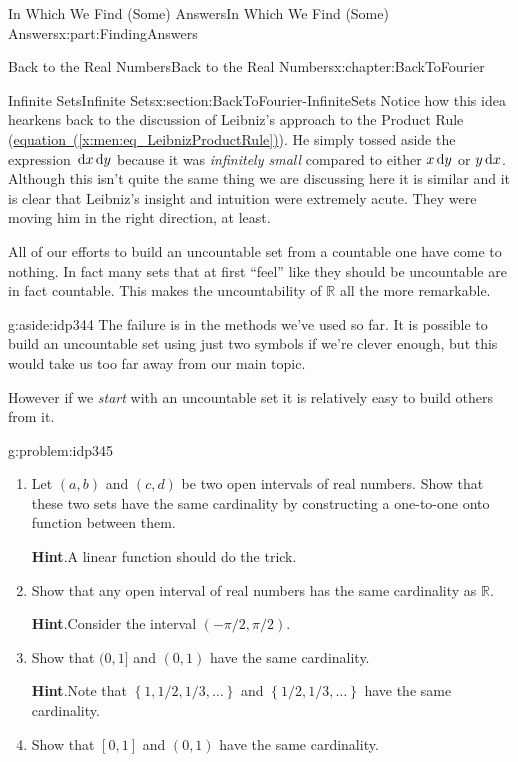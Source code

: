 \documentclass[oneside,10pt,]{book}
\newcommand{\blocktitlefont}{\relax}
\newcommand{\xreffont}{\relax}
\numberwithin{equation}{section}
\newcommand{\dx}[1]{\,{\rm d}#1}
\newcommand{\RR}{\mathbb {R}}
\begin{document}
\begin{partptx}{In Which We Find (Some) Answers}{}{In Which We Find (Some) Answers}{}{}{x:part:FindingAnswers}
\begin{chapterptx}{Back to the Real Numbers}{}{Back to the Real Numbers}{}{}{x:chapter:BackToFourier}
\begin{sectionptx}{Infinite Sets}{}{Infinite Sets}{}{}{x:section:BackToFourier-InfiniteSets}
Notice how this idea hearkens back to the discussion of Leibniz's approach to the Product Rule (\hyperref[x:men:eq_LeibnizProductRule]{equation~({\xreffont\ref{x:men:eq_LeibnizProductRule}})}). He simply tossed aside the expression \(\dx{ x}\dx{ y}\) because it was \emph{infinitely small} compared to either \(x\dx{ y}\) or \(y\dx{ x}\). Although this isn't quite the same thing we are discussing here it is similar and it is clear that Leibniz's insight and intuition were extremely acute. They were moving him in the right direction, at least.%
\par
All of our efforts to build an uncountable set from a countable one have come to nothing. In fact many sets that at first ``feel'' like they should be uncountable are in fact countable. This makes the uncountability of \(\RR\) all the more remarkable.%
\begin{aside}{}{g:aside:idp344}%
The failure is in the methods we've used so far.  It is possible to build an uncountable set using just two symbols if we're clever enough, but this would take us too far away from our main topic.%
\end{aside}
However if we \emph{start} with an uncountable set it is relatively easy to build others from it.%
\begin{problem}{}{g:problem:idp345}%
\begin{enumerate}[font=\bfseries,label=(\alph*),ref=\alph*]
\item{}Let \((a,b)\) and \((c,d)\) be two open intervals of real numbers.  Show that these two sets have the same cardinality by constructing a one-to-one onto function between them.%
\par\smallskip%
\noindent\textbf{\blocktitlefont Hint}.\hypertarget{g:hint:idp346}{}\quad{}A linear function should do the trick.%
\item{}Show that any open interval of real numbers has the same cardinality as \(\RR\).%
\par\smallskip%
\noindent\textbf{\blocktitlefont Hint}.\hypertarget{g:hint:idp347}{}\quad{}Consider the interval \((-\pi/2,\pi/2)\).%
\item{}Show that \((0,1]\) and \((0,1)\) have the same cardinality.%
\par\smallskip%
\noindent\textbf{\blocktitlefont Hint}.\hypertarget{g:hint:idp348}{}\quad{}Note that \(\left\{1,1/2,1/3,\ldots\right\}\) and \(\left\{1/2, 1/3, \ldots\right\}\) have the same cardinality.%
\item{}Show that \([0,1]\) and \((0,1)\) have the same cardinality.%

\end{enumerate}
\end{problem}
\end{sectionptx}
\end{chapterptx}
\end{partptx}
\end{document}

